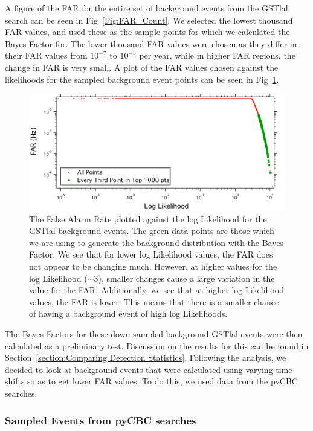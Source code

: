 \documentclass{article}
\begin{document}
  
  A figure of the FAR for the entire set of background events from the GSTlal search can be seen in Fig~\ref{Fig:FAR_Count}. We selected the lowest thousand FAR values, and used these as the sample points for which we calculated the Bayes Factor for. The lower thousand FAR values were chosen as they differ in their FAR values from $10^{-7} \text{ to } 10^{-3}$ per year, while in higher FAR regions, the change in FAR is very small. A plot of the FAR values chosen against the likelihoods for the sampled background event points can be seen in Fig~\ref{Fig:sampledPts}.  \\
  
  
  \begin{figure}[h]
  	\centering
  	\includegraphics[width=1\textwidth]{Figures/sampledPts.pdf} 
  	\caption{The False Alarm Rate plotted against the log Likelihood for the GSTlal background events. The green data points are those which we are using to generate the background distribution with the Bayes Factor. We see that for lower log Likelihood values, the FAR does not appear to be changing much. However, at higher values for the log Likelihood ($\sim3$), smaller changes cause a large variation in the value for the FAR. Additionally, we see that at higher log Likelihood values, the FAR is lower. This means that there is a smaller chance of having a background event of high log Likelihoods.}
  	\label{Fig:sampledPts}
  \end{figure}
  
  The Bayes Factors for these down sampled background GSTlal events were then calculated as a preliminary test. Discussion on the results for this can be found in Section~\ref{section:Comparing Detection Statistics}. Following the analysis, we decided to look at background events that were calculated using varying time shifts so as to get lower FAR values. To do this, we used data from the pyCBC searches.  
  
  \subsubsection{Sampled Events from pyCBC searches}
  
\end{document}
